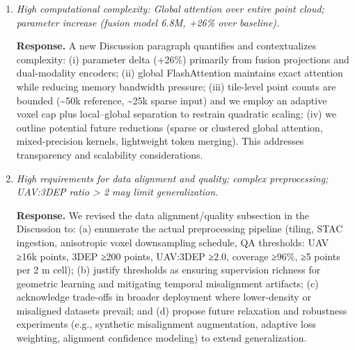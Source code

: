 \documentclass[11pt]{article}
\newcommand{\response}{\textbf{Response.} }
\begin{document}
\begin{enumerate}
  \item \emph{High computational complexity: Global attention over entire point cloud; parameter increase (fusion model 6.8M, +26\% over baseline).}

  \response A new Discussion paragraph quantifies and contextualizes complexity: (i) parameter delta (+26\%) primarily from fusion projections and dual-modality encoders; (ii) global FlashAttention maintains exact attention while reducing memory bandwidth pressure; (iii) tile-level point counts are bounded (\textasciitilde50k reference, \textasciitilde25k sparse input) and we employ an adaptive voxel cap plus local–global separation to restrain quadratic scaling; (iv) we outline potential future reductions (sparse or clustered global attention, mixed-precision kernels, lightweight token merging). This addresses transparency and scalability considerations.

  \item \emph{High requirements for data alignment and quality; complex preprocessing; UAV:3DEP ratio > 2 may limit generalization.}

  \response We revised the data alignment/quality subsection in the Discussion to: (a) enumerate the actual preprocessing pipeline (tiling, STAC ingestion, anisotropic voxel downsampling schedule, QA thresholds: UAV ≥16k points, 3DEP ≥200 points, UAV:3DEP ≥2.0, coverage ≥96\%, ≥5 points per 2 m cell); (b) justify thresholds as ensuring supervision richness for geometric learning and mitigating temporal misalignment artifacts; (c) acknowledge trade-offs in broader deployment where lower-density or misaligned datasets prevail; and (d) propose future relaxation and robustness experiments (e.g., synthetic misalignment augmentation, adaptive loss weighting, alignment confidence modeling) to extend generalization.
\end{enumerate}
\end{document}
